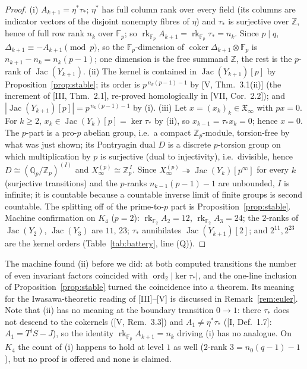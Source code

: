 \documentclass[11pt]{amsart}
\numberwithin{equation}{section}
\theoremstyle{definition}
\theoremstyle{remark}
\newcommand{\Z}{\mathbb{Z}}
\newcommand{\Q}{\mathbb{Q}}
\newcommand{\F}{\mathbb{F}}
\newcommand{\Zp}{\Z_p}
\newcommand{\Qp}{\Q_p}
\newcommand{\XX}{\mathfrak{X}_\infty}
\newcommand{\Jac}{\operatorname{Jac}}
\newcommand{\coker}{\operatorname{coker}}
\newcommand{\ord}{\operatorname{ord}}
\newcommand{\rk}{\operatorname{rk}}
\newcommand{\ta}{\tau_*}
\newcommand{\etp}{\eta^*}
\begin{document}
\begin{proof}
(i) $A_{k+1}=\etp\ta$; $\etp$ has full column rank over every field (its columns are
indicator vectors of the disjoint nonempty fibres of $\eta$) and $\ta$ is surjective
over $\Z$, hence of full row rank $n_k$ over $\F_p$; so $\rk_{\F_p}A_{k+1}=\rk_{\F_p}\ta=n_k$.
Since $p\mid q$, $\Delta_{k+1}\equiv-A_{k+1}\pmod p$, so the $\F_p$-dimension of
$\coker\Delta_{k+1}\otimes\F_p$ is $n_{k+1}-n_k=n_k(p-1)$; one dimension is the free
summand $\Z$, the rest is the $p$-rank of $\Jac(Y_{k+1})$. (ii) The kernel is contained
in $\Jac(Y_{k+1})[p]$ by Proposition~\ref{prop:stable}; its order is $p^{\,n_k(p-1)-1}$ by
[V, Thm.~3.1(ii)] (the increment of [III, Thm.~2.1], re-proved homologically in
[VII, Cor.~2.2]); and $|\Jac(Y_{k+1})[p]|=p^{\,n_k(p-1)-1}$ by (i). (iii) Let
$x=(x_k)_k\in\XX$ with $px=0$. For $k\ge2$, $x_k\in\Jac(Y_k)[p]=\ker\ta$ by (ii), so
$x_{k-1}=\ta x_k=0$; hence $x=0$. The $p$-part is a pro-$p$ abelian group, i.e.\ a
compact $\Zp$-module, torsion-free by what was just shown; its Pontryagin dual $D$ is a
discrete $p$-torsion group on which multiplication by $p$ is surjective (dual to
injectivity), i.e.\ divisible, hence $D\cong(\Qp/\Zp)^{(I)}$ and
$X_\infty^{(p)}\cong\Zp^{\,I}$. Since $X_\infty^{(p)}\twoheadrightarrow\Jac(Y_k)[p^\infty]$
for every $k$ (surjective transitions) and the $p$-ranks $n_{k-1}(p-1)-1$ are unbounded,
$I$ is infinite; it is countable because a countable inverse limit of finite groups is
second countable. The splitting off of the prime-to-$p$ part is
Proposition~\ref{prop:stable}. Machine confirmation on $K_4$ ($p=2$):
$\rk_{\F_2}A_2=12$, $\rk_{\F_2}A_3=24$; the $2$-ranks of $\Jac(Y_2)$, $\Jac(Y_3)$ are
$11$, $23$; $\ta$ annihilates $\Jac(Y_{k+1})[2]$; and $2^{11},2^{23}$ are the kernel
orders (Table~\ref{tab:battery}, line (Q)).
\end{proof}

The machine found (ii) before we did: at both computed transitions the number of even
invariant factors coincided with $\ord_2|\ker\ta|$, and the one-line inclusion of
Proposition~\ref{prop:stable} turned the coincidence into a theorem. Its meaning for the
Iwasawa-theoretic reading of [III]--[V] is discussed in Remark~\ref{rem:euler}. Note
that (ii) has no meaning at the boundary transition $0\to1$: there $\ta$ does not
descend to the cokernels ([V, Rem.~3.3]) and $A_1\ne\etp\ta$ ([I, Def.~1.7]:
$A_1=T^{t}S-J$), so the identity $\rk_{\F_p}A_{k+1}=n_k$ driving (i) has no analogue. On
$K_4$ the count of (i) happens to hold at level $1$ as well ($2$-rank $3=n_0(q-1)-1$),
but no proof is offered and none is claimed.
\end{document}
